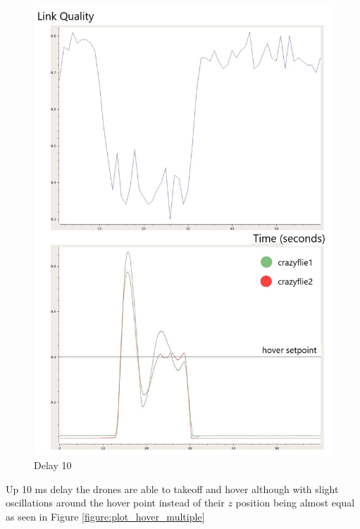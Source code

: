 \begin{figure}[H]
\centering
 \includegraphics[scale=0.35]{Figures/delay_10.jpg}
 \caption{Delay 10}
 \label{figure:rssi}
\end{figure}

\noindent Up 10 ms delay the drones are able to takeoff and hover although with slight oscillations around the hover point instead of their $z$ position being almost equal as seen in Figure \ref{figure:plot_hover_multiple}


